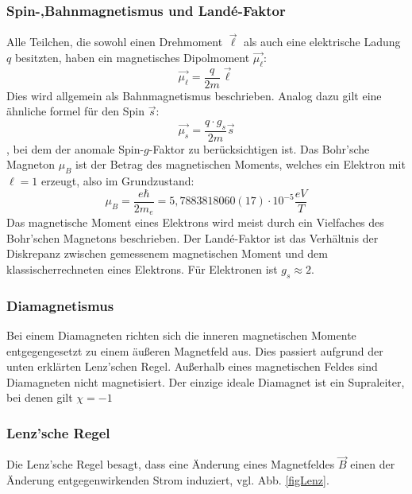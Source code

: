         \subsubsection*{Spin-,Bahnmagnetismus und Land\'e-Faktor}
            Alle Teilchen, die sowohl einen Drehmoment $\vec{\ell}$ als auch eine elektrische Ladung $q$ besitzten, haben ein magnetisches Dipolmoment $\vec{\mu_{\ell}}$:
            \begin{equation}
                \vec{\mu_{\ell}} = \frac{q}{2m} \vec{\ell}
            \end{equation}
            Dies wird allgemein als Bahnmagnetismus beschrieben. Analog dazu gilt eine ähnliche formel für den Spin $\vec{s}$:
            \begin{equation}
                \vec{\mu_s} = \frac{q\cdot g_s}{2m} \vec{s}
            \end{equation},
            bei dem der anomale Spin-$g$-Faktor zu berücksichtigen ist.
            Das Bohr'sche Magneton $\mu_B$ ist der Betrag des magnetischen Moments, welches ein Elektron
            mit $\ell=1$ erzeugt, also im Grundzustand:
            \begin{equation}
                \mu_B = \frac{e \hbar}{2 m_e} = 5,7883818060(17)\cdot 10^{-5} \frac{eV}{T}
            \end{equation}
            Das magnetische Moment eines Elektrons wird meist durch ein Vielfaches des Bohr'schen
            Magnetons beschrieben.
            Der Land\'e-Faktor ist das Verhältnis der Diskrepanz zwischen gemessenem magnetischen Moment
            und dem \dq klassisch\dq errechneten eines Elektrons. Für Elektronen ist $g_s \approx 2$.
        \subsubsection*{Diamagnetismus}
            Bei einem Diamagneten richten sich die inneren magnetischen Momente entgegengesetzt
            zu einem äußeren Magnetfeld aus. Dies passiert aufgrund der unten erklärten Lenz'schen Regel.
            Außerhalb eines magnetischen Feldes sind Diamagneten
            nicht magnetisiert. Der einzige ideale Diamagnet ist ein Supraleiter, bei denen gilt $\chi = -1$
        \subsubsection*{Lenz'sche Regel}
            Die Lenz'sche Regel besagt, dass eine Änderung eines Magnetfeldes $\vec{B}$ einen der Änderung
            entgegenwirkenden Strom induziert, vgl. Abb. \ref{figLenz}.
            
